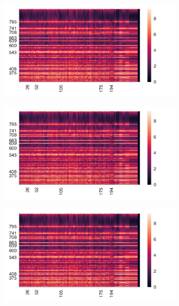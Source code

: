 \documentclass[
	fontsize=10pt, %
	twoside=true, %
	numbers=noenddot, %
]{kaobook}
\begin{document}
\begin{figure}[h]
\begin{subfigure}{8.25cm}\centering\includegraphics{comb-as12}\end{subfigure}
\begin{subfigure}{8.25cm}\centering\includegraphics{comb-as12}\end{subfigure}%
\begin{subfigure}{8.25cm}\centering\includegraphics{comb-as12}\end{subfigure}

\end{figure}
\end{document}
